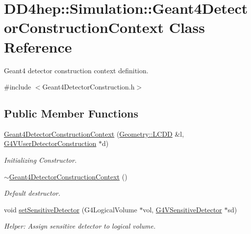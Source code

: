\hypertarget{class_d_d4hep_1_1_simulation_1_1_geant4_detector_construction_context}{}\section{D\+D4hep\+:\+:Simulation\+:\+:Geant4\+Detector\+Construction\+Context Class Reference}
\label{class_d_d4hep_1_1_simulation_1_1_geant4_detector_construction_context}


Geant4 detector construction context definition.  




{\ttfamily \#include $<$Geant4\+Detector\+Construction.\+h$>$}

\subsection*{Public Member Functions}
\begin{DoxyCompactItemize}
\item 
\hyperlink{class_d_d4hep_1_1_simulation_1_1_geant4_detector_construction_context_abb7bca1e231bedcaa5247d54dd18adda}{Geant4\+Detector\+Construction\+Context} (\hyperlink{class_d_d4hep_1_1_geometry_1_1_l_c_d_d}{Geometry\+::\+L\+C\+DD} \&l, \hyperlink{class_g4_v_user_detector_construction}{G4\+V\+User\+Detector\+Construction} $\ast$d)
\begin{DoxyCompactList}\small\item\em Initializing Constructor. \end{DoxyCompactList}\item 
\hyperlink{class_d_d4hep_1_1_simulation_1_1_geant4_detector_construction_context_a4077c4e7962225ebbaf08a9fb2814cb9}{$\sim$\+Geant4\+Detector\+Construction\+Context} ()
\begin{DoxyCompactList}\small\item\em Default destructor. \end{DoxyCompactList}\item 
void \hyperlink{class_d_d4hep_1_1_simulation_1_1_geant4_detector_construction_context_aa9715544debd86d973cf7c17c3ee0f7d}{set\+Sensitive\+Detector} (G4\+Logical\+Volume $\ast$vol, \hyperlink{class_g4_v_sensitive_detector}{G4\+V\+Sensitive\+Detector} $\ast$sd)
\begin{DoxyCompactList}\small\item\em Helper\+: Assign sensitive detector to logical volume. \end{DoxyCompactList}\end{DoxyCompactItemize}
